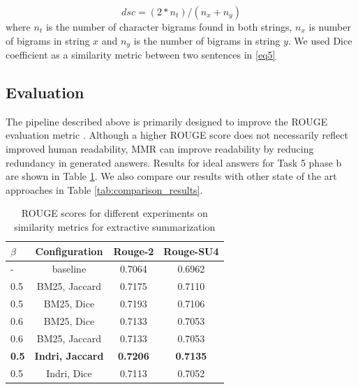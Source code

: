 \documentclass[11pt,a4paper]{article}
\begin{document}
\begin{equation*}
    dsc = (2 * n_t) / (n_x + n_y)
\end{equation*}
where $n_t$ is the number of character bigrams found in both strings, $n_x$ is number of bigrams in string $x$ and $n_y$ is the number of bigrams in string $y$. We used Dice coefficient as a similarity metric between two sentences in \ref{eq5}
\subsection{\textbf{Evaluation}} The pipeline described above is primarily designed to improve the ROUGE evaluation metric \cite{Rougue}. Although a higher ROUGE score does not necessarily reflect improved human readability, MMR can improve readability by reducing redundancy in generated answers.
Results for ideal answers for Task 5 phase b are shown in Table \ref{tab:rouge_extractive_summarization}. We also compare our results with other state of the art approaches in Table \ref{tab:comparison_results}.

\begin{table}[t!]
    \centering
    \begin{tabular}{|l|c|c|c|}
         \hline
            $\beta$& Configuration & Rouge-2 & Rouge-SU4 \\
        \hline
        \hline
        - & baseline & 0.7064 & 0.6962 \\
        \hline
        0.5 & BM25, Jaccard  & 0.7175 & 0.7110  \\ 
        \hline
        0.5 & BM25, Dice & 0.7193 & 0.7106  \\ 
        \hline
        0.6 & BM25, Dice & 0.7133 & 0.7053  \\ 
        \hline
        0.6 & BM25, Jaccard & 0.7133 & 0.7053  \\
        \hline
        \textbf{0.5} & \textbf{ Indri, Jaccard} & \textbf{0.7206} & \textbf{0.7135}  \\ 
        \hline
         0.5 & Indri, Dice & 0.7113 & 0.7052  \\ 
        \hline
    \end{tabular}
    \caption{ROUGE scores for different experiments on similarity metrics for extractive summarization}
    \label{tab:rouge_extractive_summarization}
\end{table}
\end{document}
